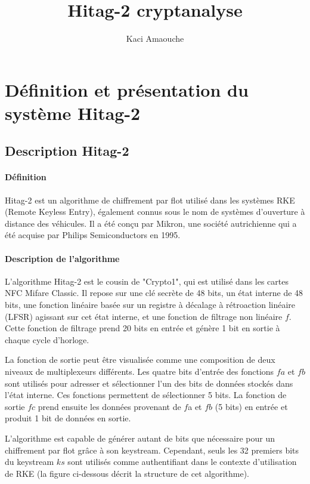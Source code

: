 \documentclass{template}
\title{Hitag-2 cryptanalyse}
\author{Kaci Amaouche}
\begin{document}
\chapter{Définition et présentation du système Hitag-2}
\section{Description Hitag-2}
\subsubsection{Définition}
\baselineskip=16pt

Hitag-2 est un algorithme de chiffrement par flot utilisé dans les systèmes RKE (Remote Keyless Entry), également connus sous le nom de systèmes d'ouverture à distance des véhicules. Il a été conçu par Mikron, une société autrichienne qui a été acquise par Philips Semiconductors en 1995.

\subsubsection{Description de l'algorithme}
\baselineskip=16pt

L'algorithme Hitag-2 est le cousin de "Crypto1", qui est utilisé dans les cartes NFC Mifare Classic. Il repose sur une clé secrète de 48 bits, un état interne de 48 bits, une fonction linéaire basée sur un registre à décalage à rétroaction linéaire (LFSR) agissant sur cet état interne, et une fonction de filtrage non linéaire $f$. Cette fonction de filtrage prend 20 bits en entrée et génère 1 bit en sortie à chaque cycle d'horloge.

La fonction de sortie peut être visualisée comme une composition de deux niveaux de multiplexeurs différents. Les quatre bits d'entrée des fonctions $fa$ et $fb$ sont utilisés pour adresser et sélectionner l'un des bits de données stockés dans l'état interne. Ces fonctions permettent de sélectionner 5 bits. La fonction de sortie $fc$ prend ensuite les données provenant de $f$a et $fb$ (5 bits) en entrée et produit 1 bit de données en sortie.

L'algorithme est capable de générer autant de bits que nécessaire pour un chiffrement par flot grâce à son keystream. Cependant, seuls les 32 premiers bits du keystream $ks$ sont utilisés comme authentifiant dans le contexte d'utilisation de RKE (la figure ci-dessous décrit la structure de cet algorithme).
\end{document}
